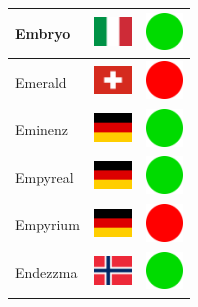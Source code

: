 \documentclass[12pt, a4paper, twoside]{report}
\begin{document}
\begin{center}
\begin{longtable}{|p{5cm}|p{2cm}|p{2cm}|}
 Embryo                                                     & \includegraphics[width=1cm]{../img/flags/it} &   \includegraphics[width=1cm]{../likes/y} \\ \hline
 Emerald                                                    & \includegraphics[width=1cm]{../img/flags/ch} &   \includegraphics[width=1cm]{../likes/n} \\ \hline
 Eminenz                                                    & \includegraphics[width=1cm]{../img/flags/de} &   \includegraphics[width=1cm]{../likes/y} \\ \hline
 Empyreal                                                   & \includegraphics[width=1cm]{../img/flags/de} &   \includegraphics[width=1cm]{../likes/y} \\ \hline
 Empyrium                                                   & \includegraphics[width=1cm]{../img/flags/de} &   \includegraphics[width=1cm]{../likes/n} \\ \hline
 Endezzma                                                   & \includegraphics[width=1cm]{../img/flags/no} &   \includegraphics[width=1cm]{../likes/y} \\ \hline

\end{longtable}
\end{center}
\end{document}
